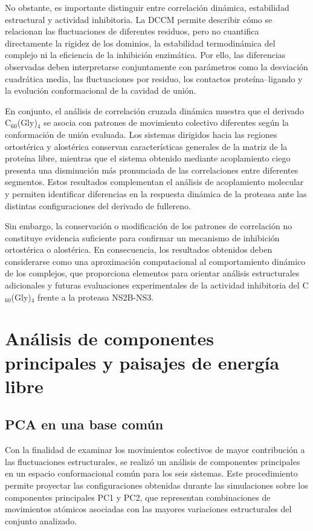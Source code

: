 No obstante, es importante distinguir entre correlación dinámica, estabilidad estructural y actividad inhibitoria. La DCCM permite describir cómo se relacionan las fluctuaciones de diferentes residuos, pero no cuantifica directamente la rigidez de los dominios, la estabilidad termodinámica del complejo ni la eficiencia de la inhibición enzimática. Por ello, las diferencias observadas deben interpretarse conjuntamente con parámetros como la desviación cuadrática media, las fluctuaciones por residuo, los contactos proteína--ligando y la evolución conformacional de la cavidad de unión.

En conjunto, el análisis de correlación cruzada dinámica muestra que el derivado C$_{60}$(Gly)$_4$ se asocia con patrones de movimiento colectivo diferentes según la conformación de unión evaluada. Los sistemas dirigidos hacia las regiones ortostérica y alostérica conservan características generales de la matriz de la proteína libre, mientras que el sistema obtenido mediante acoplamiento ciego presenta una disminución más pronunciada de las correlaciones entre diferentes segmentos. Estos resultados complementan el análisis de acoplamiento molecular y permiten identificar diferencias en la respuesta dinámica de la proteasa ante las distintas configuraciones del derivado de fullereno.

Sin embargo, la conservación o modificación de los patrones de correlación no constituye evidencia suficiente para confirmar un mecanismo de inhibición ortostérica o alostérica. En consecuencia, los resultados obtenidos deben considerarse como una aproximación computacional al comportamiento dinámico de los complejos, que proporciona elementos para orientar análisis estructurales adicionales y futuras evaluaciones experimentales de la actividad inhibitoria del C$_{60}$(Gly)$_4$ frente a la proteasa NS2B-NS3.

\section{Análisis de componentes principales y paisajes de energía libre}
\label{sec:pca_fel}

\subsection{PCA en una base común}

Con la finalidad de examinar los movimientos colectivos de mayor contribución a las fluctuaciones estructurales, se realizó un análisis de componentes principales en un espacio conformacional común para los seis sistemas. Este procedimiento permite proyectar las configuraciones obtenidas durante las simulaciones sobre los componentes principales PC1 y PC2, que representan combinaciones de movimientos atómicos asociadas con las mayores variaciones estructurales del conjunto analizado.


